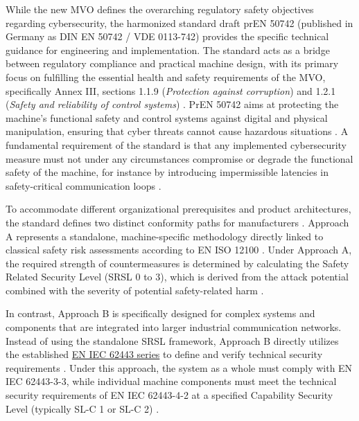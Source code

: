 While the new MVO defines the overarching regulatory safety objectives regarding cybersecurity, the harmonized standard draft prEN 50742 (published in Germany as DIN EN 50742 / VDE 0113-742) provides the specific technical guidance for engineering and implementation. The standard acts as a bridge between regulatory compliance and practical machine design, with its primary focus on fulfilling the essential health and safety requirements of the MVO, specifically Annex III, sections 1.1.9 (\textit{Protection against corruption}) and 1.2.1 (\textit{Safety and reliability of control systems}) \cite[p. 70]{prEN50742_2025}. PrEN 50742 aims at protecting the machine's functional safety and control systems against digital and physical manipulation, ensuring that cyber threats cannot cause hazardous situations \cite[p. 10]{prEN50742_2025}. A fundamental requirement of the standard is that any implemented cybersecurity measure must not under any circumstances compromise or degrade the functional safety of the machine, for instance by introducing impermissible latencies in safety-critical communication loops \cite[p. 14]{prEN50742_2025}.

To accommodate different organizational prerequisites and product architectures, the standard defines two distinct conformity paths for manufacturers \cite[p. 15]{prEN50742_2025}. Approach A represents a standalone, machine-specific methodology directly linked to classical safety risk assessments according to EN ISO 12100 \cite[p. 16]{prEN50742_2025}. Under Approach A, the required strength of countermeasures is determined by calculating the Safety Related Security Level (SRSL 0 to 3), which is derived from the attack potential combined with the severity of potential safety-related harm \cite[pp. 19]{prEN50742_2025}. 

In contrast, Approach B is specifically designed for complex systems and components that are integrated into larger industrial communication networks. Instead of using the standalone SRSL framework, Approach B directly utilizes the established \hyperref[subsec:iec_62443]{EN IEC 62443 series} to define and verify technical security requirements \cite[pp. 16, pp. 24]{prEN50742_2025}. Under this approach, the system as a whole must comply with EN IEC 62443-3-3, while individual machine components must meet the technical security requirements of EN IEC 62443-4-2 at a specified Capability Security Level (typically SL-C 1 or SL-C 2) \cite[p. 24]{prEN50742_2025}.


